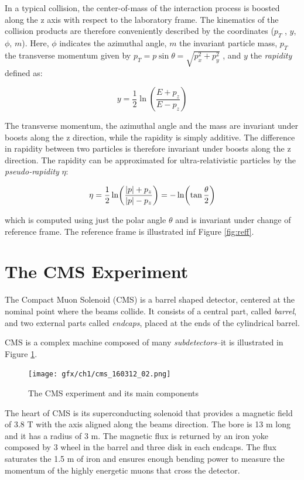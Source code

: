 In a typical collision, the center-of-mass of the interaction process is boosted along the
z axis with respect to the laboratory frame. The kinematics of the collision products are
therefore conveniently described by the coordinates ($p_T$ , $y$, $\phi$, $m$). Here, $\phi$ indicates the
azimuthal angle, $m$ the invariant particle mass, $p_T$ the transverse momentum given by $p_T =
p\sin\theta = \sqrt{p_x^2 + p_y^2}$ , and $y$ the \emph{rapidity} defined as:

\begin{equation*}
    y = \frac{1}{2}\ln(\frac{E + p_z}{E - p_z})
\end{equation*}

The transverse momentum, the azimuthal angle and the mass are invariant under boosts
along the z direction, while the rapidity is simply additive. The difference in rapidity between two particles is therefore invariant under boosts along the z direction.
The rapidity can be approximated for ultra-relativistic particles by the \emph{pseudo-rapidity} $\eta$:

\begin{equation*}
    \eta = \frac{1}{2}\ln(\frac{\abs{p}+ p_z}{\abs{p} - p_z}) = -\ln(\tan\frac{\theta}{2}) 
\end{equation*}

which is computed using just the polar angle $\theta$ and is invariant under change of reference frame.
The reference frame is illustrated inf Figure \ref{fig:reff}.

\section{The CMS Experiment}

The Compact Muon Solenoid (CMS) is a barrel shaped detector, centered at the
nominal point where the beams collide. It consists of a central part, called \emph{barrel},
and two external parts called \emph{endcaps}, placed at the ends of the cylindrical barrel.

CMS is a complex machine composed of many \emph{subdetectors}--it is illustrated in Figure \ref{fig:cms}.

\begin{figure}
    \centering
    \texttt{[image: gfx/ch1/cms\_160312\_02.png]}
    \caption[CMS]{The CMS experiment and its main components}
    \label{fig:cms}
\end{figure}

The heart of CMS is its superconducting solenoid that provides a magnetic field of
3.8 T with the axis aligned along the beams direction. The bore is 13 m long and
it has a radius of 3 m. The magnetic flux is returned by an iron yoke composed by
3 wheel in the barrel and three disk in each endcaps. The flux saturates the 1.5 m
of iron and ensures enough bending power to measure the momentum of the highly energetic muons that
cross the detector.


